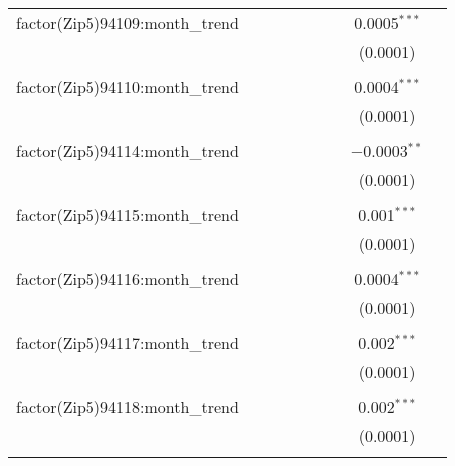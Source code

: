 \begin{table}[H]
{\begin{tabular}{@{\extracolsep{5pt}}lcccccccc}
  factor(Zip5)94109:month\_trend &  &  &  &  &  &  & 0.0005$^{***}$ &  \\  

   &  &  &  &  &  &  & (0.0001) &  \\  

   & & & & & & & & \\  

  factor(Zip5)94110:month\_trend &  &  &  &  &  &  & 0.0004$^{***}$ &  \\  

   &  &  &  &  &  &  & (0.0001) &  \\  

   & & & & & & & & \\  

  factor(Zip5)94114:month\_trend &  &  &  &  &  &  & $-$0.0003$^{**}$ &  \\  

   &  &  &  &  &  &  & (0.0001) &  \\  

   & & & & & & & & \\  

  factor(Zip5)94115:month\_trend &  &  &  &  &  &  & 0.001$^{***}$ &  \\  

   &  &  &  &  &  &  & (0.0001) &  \\  

   & & & & & & & & \\  

  factor(Zip5)94116:month\_trend &  &  &  &  &  &  & 0.0004$^{***}$ &  \\  

   &  &  &  &  &  &  & (0.0001) &  \\  

   & & & & & & & & \\  

  factor(Zip5)94117:month\_trend &  &  &  &  &  &  & 0.002$^{***}$ &  \\  

   &  &  &  &  &  &  & (0.0001) &  \\  

   & & & & & & & & \\  

  factor(Zip5)94118:month\_trend &  &  &  &  &  &  & 0.002$^{***}$ &  \\  

   &  &  &  &  &  &  & (0.0001) &  \\  

   & & & & & & & & \\  


\end{tabular}}
\end{table}
